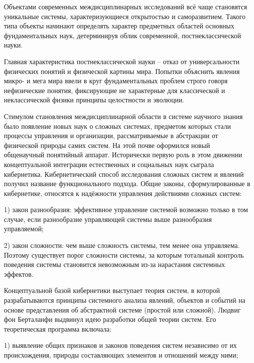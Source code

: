 \documentclass[exam_answers.tex]{subfiles}
\begin{document}
\renewcommand{\baselinestretch}{0.75}

Объектами современных междисциплинарных исследований всё чаще становятся уникальные системы, характеризующиеся открытостью и саморазвитием.
Такого типа объекты начинают определять характер предметных областей основных фундаментальных наук, детерминируя облик современной, постнеклассической науки.

Главная характеристика постнеклассической науки – отказ от универсальности физических понятий и физической картины мира.
Попытки объяснить явления микро- и мега мира ввели в круг фундаментальных проблем строго говоря нефизические понятия, фиксирующие не характерные для классической и неклассической физики принципы целостности и эволюции.

Стимулом становления междисциплинарной области в системе научного знания было появление новых наук о сложных системах, предметом которых стали процессы управления и организации, рассматриваемые в абстракции от физической природы самих систем.
На этой почве оформился новый общенаучный понятийный аппарат.
Исторически первую роль в этом движении концептуальной интеграции естественных и социальных наук сыграла кибернетика.
Кибернетический способ исследования сложных систем и явлений получил название функционального подхода.
Общие законы, сформулированные в кибернетике, относятся к надёжности управления действиями сложных систем:

1) закон разнообразия: эффективное управление системой возможно только в том случае, если разнообразие управляющей системы выше разнообразия управляемой;

2) закон сложности: чем выше сложность системы, тем менее она управляема.
Поэтому существует порог сложности системы, за которым тотальный контроль поведения системы становится невозможным из-за нарастания системных эффектов.

Концептуальной базой кибернетики выступает теория систем, в которой разрабатываются принципы системного анализа явлений, объектов и событий на основе представления об абстрактной системе (простой или сложной).
Людвиг фон Берталанфи выдвинул идею разработки общей теории систем.
Его теоретическая программа включала:

1) выявление общих признаков и законов поведения систем независимо от их происхождения, природы составляющих элементов и отношений между ними;
\end{document}
